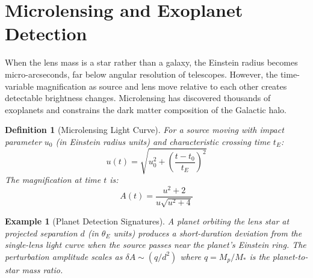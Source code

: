\documentclass[11pt,a4paper]{article}
\newtheorem{definition}{Definition}[section]
\newtheorem{example}{Example}[section]
\begin{document}
\section{Microlensing and Exoplanet Detection}

When the lens mass is a star rather than a galaxy, the Einstein radius becomes micro-arcseconds,
far below angular resolution of telescopes. However, the time-variable magnification as source
and lens move relative to each other creates detectable brightness changes. Microlensing has
discovered thousands of exoplanets and constrains the dark matter composition of the Galactic halo.

\begin{definition}[Microlensing Light Curve]
For a source moving with impact parameter $u_0$ (in Einstein radius units) and characteristic
crossing time $t_E$:
\begin{equation}
u(t) = \sqrt{u_0^2 + \left(\frac{t - t_0}{t_E}\right)^2}
\end{equation}
The magnification at time $t$ is:
\begin{equation}
A(t) = \frac{u^2 + 2}{u\sqrt{u^2 + 4}}
\end{equation}
\end{definition}

\begin{example}[Planet Detection Signatures]
A planet orbiting the lens star at projected separation $d$ (in $\theta_E$ units) produces
a short-duration deviation from the single-lens light curve when the source passes near
the planet's Einstein ring. The perturbation amplitude scales as $\delta A \sim (q/d^2)$
where $q = M_p/M_*$ is the planet-to-star mass ratio.
\end{example}
\end{document}

